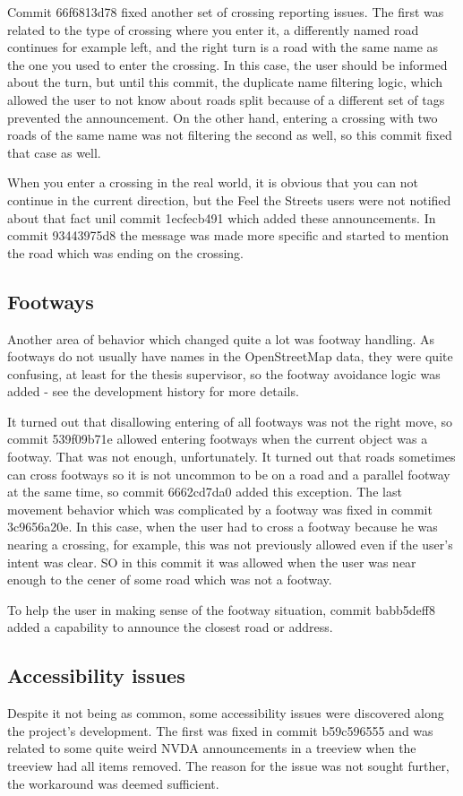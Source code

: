\documentclass[nolof,digital]{fithesis3}
\begin{document}
Commit 66f6813d78 fixed another set of crossing reporting issues. The first was related to the type of crossing where you enter it, a differently named road continues for example left, and the right turn is a road with the same name as the one you used to enter the crossing. In this case, the user should be informed about the turn, but until this commit, the duplicate name filtering logic, which allowed the user to not know about roads split because of a different set of tags prevented the announcement. On the other hand, entering a crossing with two roads of the same name was not filtering the second as well, so this commit fixed that case as well.

When you enter  a crossing in the real world, it is obvious that you can not continue in the current direction, but the Feel the Streets users were not notified about that fact unil commit 1ecfecb491 which added these announcements. In commit 93443975d8 the message was made more specific and started to mention the road which was ending on the crossing.
\subsection{Footways}
Another area of behavior which changed quite a lot was footway handling. As footways do not usually have names in the OpenStreetMap data, they were quite confusing, at least for the thesis supervisor, so the footway avoidance logic was added - see the development history for more details.

It turned out that disallowing entering of all footways was not the right move, so commit 539f09b71e allowed entering footways when the current object was a footway. That was not enough, unfortunately. It turned out that roads sometimes can cross footways so it is not uncommon to be on a road and a parallel footway at the same time, so commit 6662cd7da0 added this exception. The last movement behavior which was complicated by a footway was fixed in commit 3c9656a20e. In this case, when the user had to cross a footway because he was nearing a crossing, for example, this was not previously allowed even if the user's intent was clear. SO in this commit it was allowed when the user was near enough to the cener of some road which was not a footway.

To help the user in making sense of the footway situation, commit babb5deff8 added a capability to announce the closest road or address.
\subsection{Accessibility issues}
Despite it not being as common, some accessibility issues were discovered along the project's development. The first was fixed in commit b59c596555 and was related to some quite weird NVDA announcements in a treeview when the treeview had all items removed. The reason for the issue was not sought further, the workaround was deemed sufficient.
\end{document}
